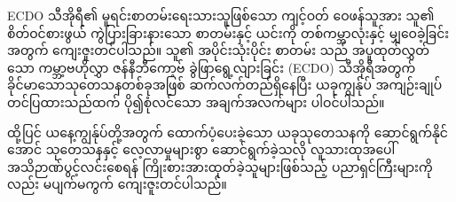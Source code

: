 \documentclass[10pt,twocolumn,letterpaper]{article}
\begin{document}
ECDO သီအိုရီ၏ မူရင်းစာတမ်းရေးသားသူဖြစ်သော ကျင့်ဝတ် ဝေဖန်သူအား သူ၏ စိတ်ဝင်စားဖွယ် ကွဲပြားခြားနားသော စာတမ်းနှင့် ယင်းကို တစ်ကမ္ဘာလုံးနှင့် မျှဝေခဲ့ခြင်းအတွက် ကျေးဇူးတင်ပါသည်။ သူ၏ အပိုင်းသုံးပိုင်း စာတမ်း \cite{1} သည် အပူထုတ်လွှတ်သော ကမ္ဘာ့ဗဟိုလွှာ ဇန်နီဘီကော့ဗ် ခွဲဖြာရွေ့လျားခြင်း (ECDO) သီအိုရီအတွက် ခိုင်မာသောသုတေသနတစ်ခုအဖြစ် ဆက်လက်တည်ရှိနေပြီး ယခုကျွန်ုပ် အကျဉ်းချုပ် တင်ပြထားသည်ထက် ပို၍စုံလင်သော အချက်အလက်များ ပါဝင်ပါသည်။

ထို့ပြင် ယနေ့ကျွန်ုပ်တို့အတွက် ထောက်ပံ့ပေးခဲ့သော ယခုသုတေသနကို ဆောင်ရွက်နိုင်အောင် သုတေသနနှင့် လေ့လာမှုများစွာ ဆောင်ရွက်ခဲ့သလို လူသားထုအပေါ် အသိဉာဏ်ပွင့်လင်းစေရန် ကြိုးစားအားထုတ်ခဲ့သူများဖြစ်သည့် ပညာရှင်ကြီးများကိုလည်း မပျက်မကွက် ကျေးဇူးတင်ပါသည်။

\clearpage
\twocolumn

{\small


}
\end{document}
